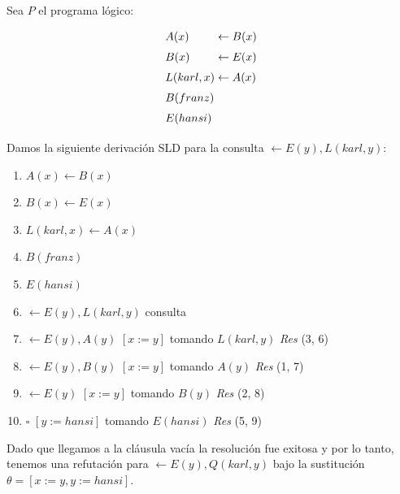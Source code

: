 \documentclass[12pt,letterpaper]{article}
\newcommand{\dmp}{\leftarrow}
\begin{document}
\begin{enumerate}
  \medskip

  Sea $P$ el programa lógico:
  \[\arraycolsep=1.4pt\def\arraystretch{1.5}
  \begin{array}{lcl}
    A(x) &\leftarrow& B(x)\\
    B(x) &\leftarrow& E(x)\\
    L(karl,x) &\leftarrow& A(x)\\
    B(franz)&&\\
    E(hansi)&&
  \end{array}
  \]

  Damos la siguiente derivación SLD para la consulta $\dmp E(y), L(karl,y)$:
  \begin{center}
    \begin{enumerate}[label=\arabic*.]
    \item \( A(x) \dmp B(x) \)
    \item \( B(x) \dmp E(x) \)
    \item \( L(karl,x) \dmp A(x) \)
    \item \( B(franz) \) 
    \item \( E(hansi) \) 
    \item \( \dmp E(y), L(karl,y) \) \hspace{7cm} consulta
    \item \( \dmp E(y), A(y) \) \hspace{0.7cm} $[x := y]$ \hspace{0.7cm} tomando \( L(karl,y)\) \hspace{0.9cm} \textit{Res} (3, 6)
    \item \( \dmp E(y), B(y) \) \hspace{0.7cm} $[x := y]$ \hspace{1.6cm} tomando \( A(y)\) \hspace{0.87cm} \textit{Res} (1, 7)
    \item \( \dmp E(y) \) \hspace{1.77cm} $[x := y]$ \hspace{1.6cm} tomando \( B(y)\) \hspace{0.86cm} \textit{Res} (2, 8)
    \item \( \square \) \hspace{2.85cm} $[y := hansi]$ \hspace{0cm} tomando \( E(hansi)\) \hspace{0.85cm} \textit{Res} (5, 9)
    \end{enumerate}
  \end{center}

  Dado que llegamos a la cláusula vacía la resolución fue exitosa y por lo tanto, tenemos una refutación para $\dmp E(y), Q(karl, y)$ bajo la sustitución $\theta = [x:= y, y := hansi]$.
  

\end{enumerate}
\end{document}
